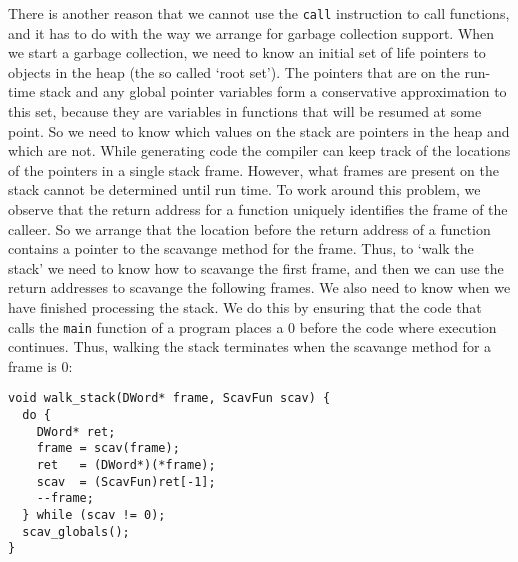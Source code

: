 \documentclass{article}
\begin{document}
There is another reason that we cannot use the {\tt call} instruction to 
call functions, and it has to do with the way we arrange for garbage collection
support.  When we start a garbage collection, we need to know an initial
set of life pointers to objects in the heap (the so called `root set').
The pointers that are on the run-time stack and any global pointer variables
form a conservative approximation to this set, because they are variables 
in functions that will be resumed at some point.  
So we need to know which values on the stack are pointers in
the heap and which are not.   While generating code the compiler can keep
track of the locations of the pointers in a single stack frame.  However,
what frames are present on the stack cannot be determined until run time.
To work around this problem, we observe that the return address for a function
uniquely identifies the frame of the calleer.  So we arrange that the location
before the return address of a function contains a pointer to the scavange
method for the frame.  Thus, to `walk the stack' we need to know how to
scavange the first frame, and then we can use the return addresses to  
scavange the following frames.  We also need to know when we have
finished processing the stack.  We do this by ensuring that the code
that calls the {\tt main} function of a program places a 0 before the code
where execution continues.  Thus, walking the stack terminates when the
scavange method for a frame is 0:
\begin{verbatim}
void walk_stack(DWord* frame, ScavFun scav) {
  do {
    DWord* ret;
    frame = scav(frame);
    ret   = (DWord*)(*frame);
    scav  = (ScavFun)ret[-1];
    --frame;
  } while (scav != 0);
  scav_globals();
}
\end{verbatim}
\end{document}

